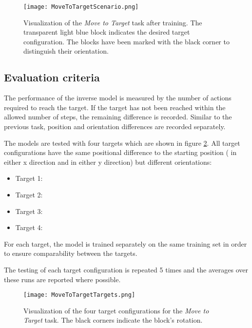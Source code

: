 \begin{figure}
\centering
\texttt{[image: MoveToTargetScenario.png]}
\caption{Visualization of the \textit{Move to Target} task after training. The transparent light blue block indicates the desired target configuration. The blocks have been marked with the black corner to distinguish their orientation.}
\label{fig:moveToTargetScenario}
\end{figure}

\subsection{Evaluation criteria}

The performance of the inverse model is measured by the number of actions required to reach the target. If the target has not been reached within the allowed number of steps, the remaining difference is recorded. Similar to the previous task, position and orientation differences are recorded separately.


The models are tested with four targets which are shown in figure  \ref{fig:targetPositions}. All target configurations have the same positional difference to the starting position ( in either x direction and  in either y direction) but different orientations: 
\begin{itemize}
\item Target 1: 
\item Target 2: 
\item Target 3:  
\item Target 4: 
\end{itemize}
For each target, the model is trained separately on the same training set in order to ensure comparability between the targets.

The testing of each target configuration is repeated 5 times and the averages over these runs are reported where possible.

\begin{figure}
\centering
\texttt{[image: MoveToTargetTargets.png]}
\caption{Visualization of the four target configurations for the \textit{Move to Target} task. The black corners indicate the block's rotation.}
\label{fig:targetPositions}
\end{figure}

